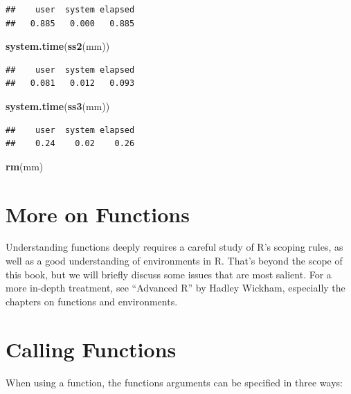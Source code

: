 \documentclass[
]{krantz}
\newenvironment{Shaded}{\begin{snugshade}}{\end{snugshade}}
\newcommand{\KeywordTok}[1]{\textcolor[rgb]{0.13,0.29,0.53}{\textbf{#1}}}
\newcommand{\NormalTok}[1]{#1}
\begin{document}
\begin{verbatim}
##    user  system elapsed 
##   0.885   0.000   0.885
\end{verbatim}

\begin{Shaded}
\begin{Highlighting}[]
\KeywordTok{system.time}\NormalTok{(}\KeywordTok{ss2}\NormalTok{(mm))}
\end{Highlighting}
\end{Shaded}

\begin{verbatim}
##    user  system elapsed 
##   0.081   0.012   0.093
\end{verbatim}

\begin{Shaded}
\begin{Highlighting}[]
\KeywordTok{system.time}\NormalTok{(}\KeywordTok{ss3}\NormalTok{(mm))}
\end{Highlighting}
\end{Shaded}

\begin{verbatim}
##    user  system elapsed 
##    0.24    0.02    0.26
\end{verbatim}

\begin{Shaded}
\begin{Highlighting}[]
\KeywordTok{rm}\NormalTok{(mm)}
\end{Highlighting}
\end{Shaded}

\hypertarget{more-on-functions}{%
\section{More on Functions}\label{more-on-functions}}

Understanding functions deeply requires a careful study of R's scoping rules, as well as a good understanding of environments in R. That's beyond the scope of this book, but we will briefly discuss some issues that are most salient. For a more in-depth treatment, see ``Advanced R'' by Hadley Wickham, especially the chapters on functions and environments.

\hypertarget{calling-functions}{%
\section{Calling Functions}\label{calling-functions}}

When using a function, the functions arguments can be specified in three ways:
\end{document}
